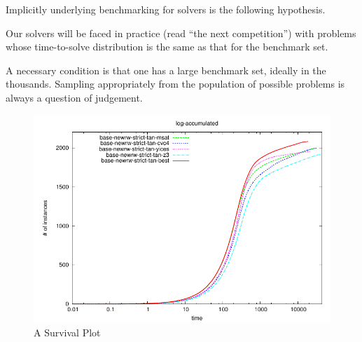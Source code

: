Implicitly underlying benchmarking for solvers is the following hypothesis.
\begin{hypothesis}Our solvers will be faced in practice (read ``the next competition'') with problems whose time-to-solve distribution is the same as that for the benchmark set.
\end{hypothesis}
A necessary condition is that one has a large benchmark set, ideally in the thousands. Sampling appropriately from the population of possible problems is always a question of judgement.
\begin{figure}[h]
\caption{A Survival Plot\label{fig:survivor}}
\includegraphics{log-accumulated2.pdf}
\vskip-0pt
\end{figure}
